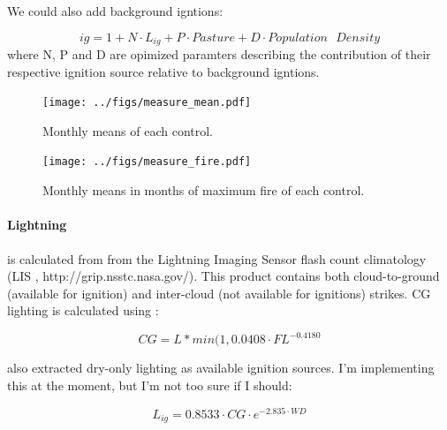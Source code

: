 \begin{shaded}
    We could also add background igntions:

    \begin{equation}
        ig = 1 + N \cdot L_{ig} + P \cdot Pasture + D \cdot Population\text{ }Density
    \end{equation}
    where N, P and D are opimized paramters describing the contribution of their respective ignition source relative to background igntions.
\end{shaded}


\begin{figure}[!ht]
  \centering
    \texttt{[image: ../figs/measure\_mean.pdf]}
  \caption{Monthly means of each control. }
  \label{fig:Monthly_mean_controls}
\end{figure}

\begin{figure}[!ht]
  \centering
    \texttt{[image: ../figs/measure\_fire.pdf]}
  \caption{Monthly means in months of maximum fire of each control. }
  \label{fig:Season_mean_controls}
\end{figure}

\paragraph{Lightning}
is calculated from
from the Lightning Imaging Sensor flash count climatology (LIS \cite{christian1999lightning}, http://grip.nsstc.nasa.gov/). 
This product contains both cloud-to-ground (available for ignition) and inter-cloud (not available for ignitions) strikes.
CG lighting is calculated using \citet{kelley2014improved}:

\begin{equation}
    CG = L * min(1, 0.0408 \cdot FL^{-0.4180}
\end{equation}

\begin{shaded}
    \citet{kelley2014improved} also extracted dry-only lighting as available ignition sources. I'm implementing this at the moment, but I'm not too sure if I should:

\begin{equation}
    L_{ig} = 0.8533 \cdot CG \cdot e^{-2.835 \cdot WD}
\end{equation}
\end{shaded}

